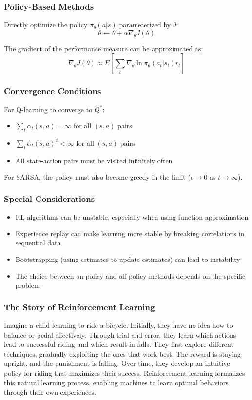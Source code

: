 \documentclass{article}
\begin{document}
\subsubsection{Policy-Based Methods}
Directly optimize the policy $\pi_\theta(a|s)$ parameterized by $\theta$:
\begin{equation}
    \theta \leftarrow \theta + \alpha \nabla_\theta J(\theta)
\end{equation}

The gradient of the performance measure can be approximated as:
\begin{equation}
    \nabla_\theta J(\theta) \approx E\left[\sum_{t} \nabla_\theta \ln \pi_\theta(a_t|s_t) r_t\right]
\end{equation}

\subsubsection{Convergence Conditions}
For Q-learning to converge to $Q^*$:
\begin{itemize}
    \item $\sum_t \alpha_t(s,a) = \infty$ for all $(s,a)$ pairs
    \item $\sum_t \alpha_t(s,a)^2 < \infty$ for all $(s,a)$ pairs
    \item All state-action pairs must be visited infinitely often
\end{itemize}

For SARSA, the policy must also become greedy in the limit ($\epsilon \to 0$ as $t \to \infty$).

\subsubsection{Special Considerations}
\begin{itemize}
    \item RL algorithms can be unstable, especially when using function approximation
    \item Experience replay can make learning more stable by breaking correlations in sequential data
    \item Bootstrapping (using estimates to update estimates) can lead to instability
    \item The choice between on-policy and off-policy methods depends on the specific problem
\end{itemize}

\subsubsection{The Story of Reinforcement Learning}
Imagine a child learning to ride a bicycle. Initially, they have no idea how to balance or pedal effectively. Through trial and error, they learn which actions lead to successful riding and which result in falls. They first explore different techniques, gradually exploiting the ones that work best. The reward is staying upright, and the punishment is falling. Over time, they develop an intuitive policy for riding that maximizes their success. Reinforcement learning formalizes this natural learning process, enabling machines to learn optimal behaviors through their own experiences.
\end{document}
